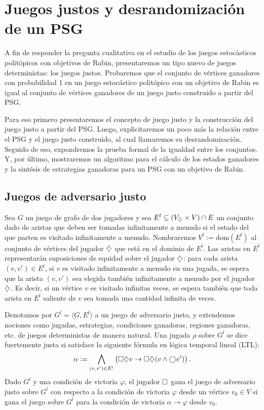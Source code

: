 \section{Juegos justos y desrandomización de un PSG}
\label{sec:prueba}

A fin de responder la pregunta cualitativa en el estudio de los juegos
estocásticos politópicos con objetivos de Rabin, presentaremos un tipo nuevo de
juegos deterministas: los juegos justos. Probaremos que el conjunto de vértices
ganadores con probabilidad 1 en un juego estocástico politópico con un objetivo
de Rabin es igual al conjunto de vértices ganadores de un juego justo
construido a partir del PSG.

Para eso primero presentaremos el concepto de juego justo y la construcción del
juego justo a partir del PSG. Luego, explicitaremos un poco más la relación
entre el PSG y el juego justo construido, al cual llamaremos su
desrandomización. Seguido de eso, expondremos la prueba formal de la igualdad
entre los conjuntos. Y, por último, mostraremos un algoritmo para el cálculo de
los estados ganadores y la sintésis de estrategias ganadoras para un PSG con un
objetivo de Rabin. %

\subsection*{Juegos de adversario justo}

Sea $G$ un juego de grafo de dos jugadores y sea $E^{l} \subseteq (V_\diamondsuit
	\times V) \cap E$ un conjunto dado de aristas que deben ser tomadas
infinitamente a menudo si el estado del que parten es visitado infinitamente a
menudo. Nombraremos $V^{l} := \mathrm{dom}(E^{l})$ al conjunto de vértices del
jugador $\diamondsuit$ que está en el dominio de $E^{l}$. Las aristas en $E^{l}$
representarán suposiciones de equidad sobre el jugador $\diamondsuit$: para cada
arista $(v, v') \in E^{l}$, si $v$ es visitado infinitamente a menudo en una
jugada, se espera que la arista $(v, v')$ sea elegida también infinitamente a
menudo por el jugador $\diamondsuit$. Es decir, si un vértice $v$ es visitado
infinitas veces, se espera también que toda arista en $E^l$ saliente de $v$ sea
tomada una cantidad infinita de veces.

Denotamos por $G^{l} = \langle G, E^{l} \rangle$ a un juego de adversario
justo, y extendemos nociones como jugadas, estrategias, condiciones ganadoras,
regiones ganadoras, etc. de juegos deterministas de manera natural. Una jugada
$\rho$ sobre $G^{l}$ se dice fuertemente justa si satisface la siguiente
fórmula en lógica temporal lineal (LTL):
\[
	\alpha := \bigwedge_{(v, v') \in E^{l}} \left( \square \diamondsuit v \rightarrow \square \diamondsuit (v \wedge \bigcirc v') \right).
\]
Dado $G^{l}$ y una condición de victoria $\varphi$, el jugador $\square$ gana el
juego de adversario justo sobre $G^{l}$ con respecto a la condición de victoria
$\varphi$ desde un vértice $v_0 \in V$ si gana el juego sobre $G^{l}$ para la
condición de victoria $\alpha \rightarrow \varphi$ desde $v_0$.

